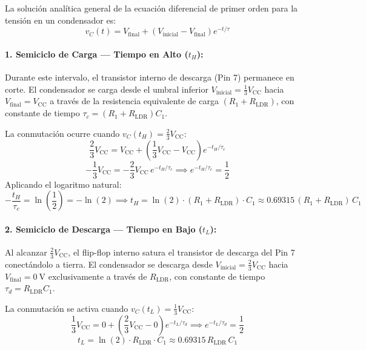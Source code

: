 \documentclass[11pt,letterpaper]{article}
\begin{document}
La solución analítica general de la ecuación diferencial de primer orden para la tensión en un condensador es:
\begin{equation}
v_C(t) = V_{\text{final}} + \left( V_{\text{inicial}} - V_{\text{final}} \right) e^{-t / \tau}
\label{eq:rc_transitorio}
\end{equation}

\paragraph{1. Semiciclo de Carga --- Tiempo en Alto ($t_H$):}
Durante este intervalo, el transistor interno de descarga (Pin 7) permanece en corte. El condensador se carga desde el umbral inferior $V_{\text{inicial}} = \frac{1}{3}V_{\text{CC}}$ hacia $V_{\text{final}} = V_{\text{CC}}$ a través de la resistencia equivalente de carga $(R_1 + R_{\text{LDR}})$, con constante de tiempo $\tau_c = (R_1 + R_{\text{LDR}}) C_1$. 

La conmutación ocurre cuando $v_C(t_H) = \frac{2}{3}V_{\text{CC}}$:
\begin{equation}
\frac{2}{3}V_{\text{CC}} = V_{\text{CC}} + \left( \frac{1}{3}V_{\text{CC}} - V_{\text{CC}} \right) e^{-t_H / \tau_c}
\end{equation}
\begin{equation}
-\frac{1}{3}V_{\text{CC}} = -\frac{2}{3}V_{\text{CC}} \, e^{-t_H / \tau_c} \implies e^{-t_H / \tau_c} = \frac{1}{2}
\end{equation}
Aplicando el logaritmo natural:
\begin{equation}
-\frac{t_H}{\tau_c} = \ln\left( \frac{1}{2} \right) = -\ln(2) \implies \boxed{t_H = \ln(2) \cdot (R_1 + R_{\text{LDR}}) \cdot C_1 \approx 0.69315\,(R_1 + R_{\text{LDR}})\,C_1}
\label{eq:th_deducido}
\end{equation}

\paragraph{2. Semiciclo de Descarga --- Tiempo en Bajo ($t_L$):}
Al alcanzar $\frac{2}{3}V_{\text{CC}}$, el flip-flop interno satura el transistor de descarga del Pin 7 conectándolo a tierra. El condensador se descarga desde $V_{\text{inicial}} = \frac{2}{3}V_{\text{CC}}$ hacia $V_{\text{final}} = \SI{0}{\volt}$ exclusivamente a través de $R_{\text{LDR}}$, con constante de tiempo $\tau_d = R_{\text{LDR}} C_1$.

La conmutación se activa cuando $v_C(t_L) = \frac{1}{3}V_{\text{CC}}$:
\begin{equation}
\frac{1}{3}V_{\text{CC}} = 0 + \left( \frac{2}{3}V_{\text{CC}} - 0 \right) e^{-t_L / \tau_d} \implies e^{-t_L / \tau_d} = \frac{1}{2}
\end{equation}
\begin{equation}
\boxed{t_L = \ln(2) \cdot R_{\text{LDR}} \cdot C_1 \approx 0.69315\,R_{\text{LDR}}\,C_1}
\label{eq:tl_deducido}
\end{equation}
\end{document}
